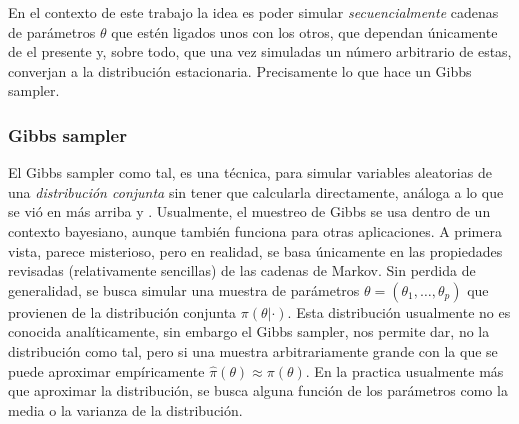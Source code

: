 \documentclass[../Main/Main.tex]{subfiles}
\begin{document}
En el contexto de este trabajo la idea es poder simular \textit{secuencialmente} cadenas de parámetros $\theta$ que estén ligados unos con los otros, que dependan únicamente de el presente y,  sobre todo, que una vez simuladas un número arbitrario de estas, converjan a la distribución estacionaria. Precisamente lo que hace un Gibbs sampler.

\subsubsection{Gibbs sampler}
El Gibbs sampler como tal, es una técnica, para simular variables aleatorias de una \textit{distribución conjunta} sin tener que calcularla directamente, análoga a lo que se vió en más arriba \autocite{gelfand1990sampling} y \autocite{casella1992explaining}. Usualmente, el muestreo de Gibbs se usa dentro de un contexto bayesiano, aunque también funciona para otras aplicaciones. A primera vista, parece misterioso, pero en realidad, se basa únicamente en las propiedades revisadas (relativamente sencillas) de las cadenas de Markov. Sin perdida de generalidad, se busca simular una muestra de parámetros $\theta = (\theta_1,\ldots,\theta_p)$ que provienen de la distribución conjunta $\pi(\theta|\cdot)$. Esta distribución usualmente no es conocida analíticamente, sin embargo el Gibbs sampler, nos permite dar, no la distribución como tal, pero si una muestra arbitrariamente grande con la que se puede aproximar empíricamente $\hat{\pi}(\theta) \approx \pi(\theta)$. En la practica usualmente más que aproximar la distribución, se busca alguna función de los parámetros como la media o la varianza de la distribución.\\
\end{document}
